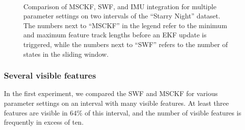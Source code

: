 \documentclass[letterpaper, 10 pt, conference]{ieeeconf}  %
\begin{document}
\begin{figure}
    \centering
    ~
    \caption{Comparison of MSCKF, SWF, and IMU integration for multiple parameter settings on two intervals of the ``Starry Night'' dataset. The numbers next to ``MSCKF'' in the legend refer to the minimum and maximum feature track lengths before an EKF update is triggered, while the numbers next to ``SWF'' refers to the number of states in the sliding window.}
\end{figure}


\subsubsection{Several visible features}
In the first experiment, we compared the SWF and MSCKF for various parameter settings on an interval with many visible features.
At least three features are visible in $64\%$ of this interval, and the number of visible features is frequently in excess of ten.

\end{document}
